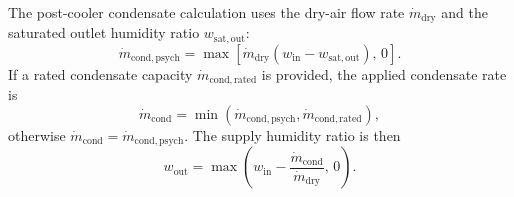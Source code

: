 \documentclass[11pt]{article}
\begin{document}
The post-cooler condensate calculation uses the dry-air flow rate \(\dot m_{\mathrm{dry}}\) and the saturated outlet humidity ratio \(w_{\mathrm{sat,out}}\):
\begin{equation}
\label{eq:psychrometric_condensate}
\dot m_{\mathrm{cond,psych}}=
\max\!\left[\dot m_{\mathrm{dry}}\left(w_{\mathrm{in}}-w_{\mathrm{sat,out}}\right),\,0\right].
\end{equation}
If a rated condensate capacity \(\dot m_{\mathrm{cond,rated}}\) is provided, the applied condensate rate is
\begin{equation}
\label{eq:condensate_limited}
\dot m_{\mathrm{cond}}=
\min\!\left(\dot m_{\mathrm{cond,psych}},\dot m_{\mathrm{cond,rated}}\right),
\end{equation}
otherwise \(\dot m_{\mathrm{cond}}=\dot m_{\mathrm{cond,psych}}\). The supply humidity ratio is then
\begin{equation}
\label{eq:outlet_humidity_ratio}
w_{\mathrm{out}}=
\max\!\left(w_{\mathrm{in}}-\frac{\dot m_{\mathrm{cond}}}{\dot m_{\mathrm{dry}}},\,0\right).
\end{equation}
\end{document}

